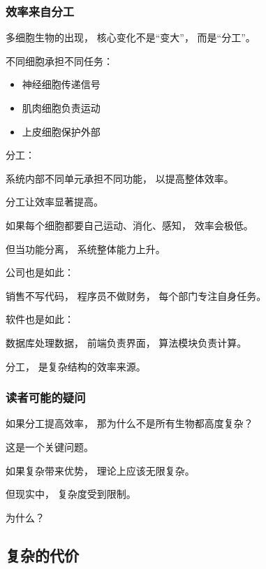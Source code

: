 \documentclass[../main.tex]{subfiles}
\begin{document}
\subsubsection{效率来自分工}

多细胞生物的出现，
核心变化不是“变大”，
而是“分工”。

不同细胞承担不同任务：

\begin{itemize}
	\item 神经细胞传递信号
	\item 肌肉细胞负责运动
	\item 上皮细胞保护外部
\end{itemize}

\begin{definitionbox}
	分工：
	
	系统内部不同单元承担不同功能，
	以提高整体效率。
\end{definitionbox}

分工让效率显著提高。

\begin{examplebox}
	如果每个细胞都要自己运动、消化、感知，
	效率会极低。
	
	但当功能分离，
	系统整体能力上升。
\end{examplebox}

公司也是如此：

销售不写代码，
程序员不做财务，
每个部门专注自身任务。

软件也是如此：

数据库处理数据，
前端负责界面，
算法模块负责计算。

分工，
是复杂结构的效率来源。

\subsubsection{读者可能的疑问}

\begin{questionbox}
	如果分工提高效率，
	那为什么不是所有生物都高度复杂？
\end{questionbox}

这是一个关键问题。

如果复杂带来优势，
理论上应该无限复杂。

但现实中，
复杂度受到限制。

为什么？

\subsection{复杂的代价}
\end{document}
